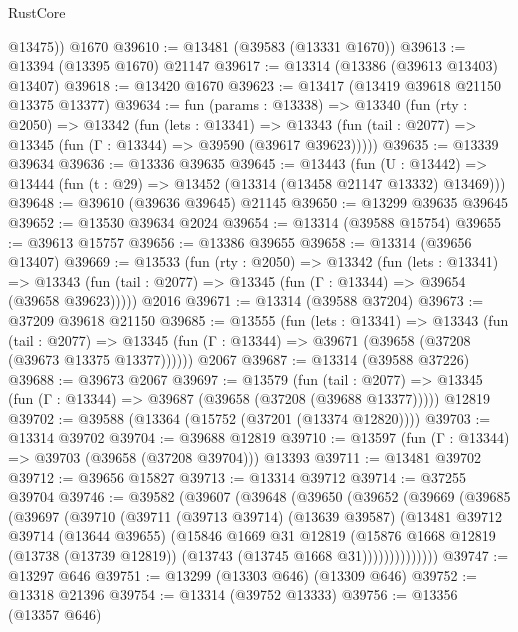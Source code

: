 \begin{lexlean}{RustCore}
\begin{coremodule}
        @13475))
    @1670
@39610 := @13481 (@39583 (@13331 @1670))
@39613 := @13394 (@13395 @1670) @21147
@39617 := @13314 (@13386 (@39613 @13403) @13407)
@39618 := @13420 @1670
@39623 := @13417 (@13419 @39618 @21150 @13375 @13377)
@39634 := fun (params : @13338) =>
  @13340
    (fun (rty : @2050) =>
    @13342
      (fun (lets : @13341) =>
      @13343 (fun (tail : @2077) => @13345 (fun (Γ : @13344) => @39590 (@39617 @39623)))))
@39635 := @13339 @39634
@39636 := @13336 @39635
@39645 := @13443
    (fun (U : @13442) => @13444 (fun (t : @29) => @13452 (@13314 (@13458 @21147 @13332) @13469)))
@39648 := @39610 (@39636 @39645) @21145
@39650 := @13299 @39635 @39645
@39652 := @13530 @39634 @2024
@39654 := @13314 (@39588 @15754)
@39655 := @39613 @15757
@39656 := @13386 @39655
@39658 := @13314 (@39656 @13407)
@39669 := @13533
    (fun (rty : @2050) =>
    @13342
      (fun (lets : @13341) =>
      @13343 (fun (tail : @2077) => @13345 (fun (Γ : @13344) => @39654 (@39658 @39623)))))
    @2016
@39671 := @13314 (@39588 @37204)
@39673 := @37209 @39618 @21150
@39685 := @13555
    (fun (lets : @13341) =>
    @13343
      (fun (tail : @2077) =>
      @13345 (fun (Γ : @13344) => @39671 (@39658 (@37208 (@39673 @13375 @13377))))))
    @2067
@39687 := @13314 (@39588 @37226)
@39688 := @39673 @2067
@39697 := @13579
    (fun (tail : @2077) => @13345 (fun (Γ : @13344) => @39687 (@39658 (@37208 (@39688 @13377)))))
    @12819
@39702 := @39588 (@13364 (@15752 (@37201 (@13374 @12820))))
@39703 := @13314 @39702
@39704 := @39688 @12819
@39710 := @13597 (fun (Γ : @13344) => @39703 (@39658 (@37208 @39704))) @13393
@39711 := @13481 @39702
@39712 := @39656 @15827
@39713 := @13314 @39712
@39714 := @37255 @39704
@39746 := @39582
    (@39607
      (@39648
        (@39650
          (@39652
            (@39669
              (@39685
                (@39697
                  (@39710
                    (@39711
                      (@39713 @39714)
                      (@13639 @39587)
                      (@13481
                        @39712
                        @39714
                        (@13644 @39655)
                        (@15846
                          @1669
                          @31
                          @12819
                          (@15876
                            @1668
                            @12819
                            (@13738 (@13739 @12819))
                            (@13743 (@13745 @1668 @31))))))))))))))
@39747 := @13297 @646
@39751 := @13299 (@13303 @646) (@13309 @646)
@39752 := @13318 @21396
@39754 := @13314 (@39752 @13333)
@39756 := @13356 (@13357 @646)

\end{coremodule}
\end{lexlean}
